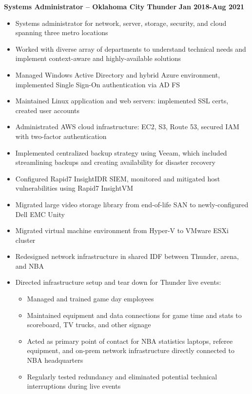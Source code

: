 \documentclass[line]{res}
\begin{document}
\begin{resume}
\textbf{Systems Administrator -- Oklahoma City Thunder}
\newline
\textbf{Jan 2018-Aug 2021}
\begin{itemize}
		\item Systems administrator for network, server, storage, security, and cloud spanning three metro locations
		\item Worked with diverse array of departments to understand technical needs and implement context-aware and highly-available solutions
		\item Managed Windows Active Directory and hybrid Azure environment, implemented Single Sign-On authentication via AD FS
		\item Maintained Linux application and web servers: implemented SSL certs, created user accounts
		\item Administrated AWS cloud infrastructure: EC2, S3, Route 53, secured IAM with two-factor authentication
		\item Implemented centralized backup strategy using Veeam, which included streamlining backups and creating availability for disaster recovery
		\item Configured Rapid7 InsightIDR SIEM, monitored and mitigated host vulnerabilities using Rapid7 InsightVM
		\item Migrated large video storage library from end-of-life SAN to newly-configured Dell EMC Unity
		\item Migrated virtual machine environment from Hyper-V to VMware ESXi cluster
		\item Redesigned network infrastructure in shared IDF between Thunder, arena, and NBA 
\item Directed infrastructure setup and tear down for Thunder live events:
	\begin{itemize}
		\item Managed and trained game day employees
		\item Maintained equipment and data connections for game time and stats to scoreboard, TV trucks, and other signage
		\item Acted as primary point of contact for NBA statistics laptops, referee equipment, and on-prem network infrastructure directly connected to NBA headquarters
		\item Regularly tested redundancy and eliminated potential technical interruptions during live events
	\end{itemize}
\end{itemize}
	

\end{resume}
\end{document}
